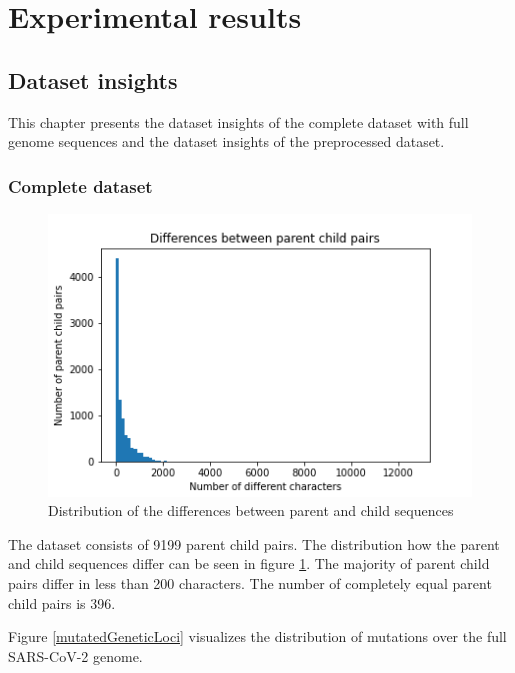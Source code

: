 \section{Experimental results} \label{experiments}

\subsection{Dataset insights}  \label{ch:experimentsA}

This chapter presents the dataset insights of the complete dataset with full genome sequences and the dataset insights of the preprocessed dataset.

\subsubsection{Complete dataset}  \label{ch:experimentsAa}

\begin{figure}
	\centering
	\includegraphics[width=0.9\linewidth]{figures/distributionDifferencesParentChild.png}
	\caption{Distribution of the differences between parent and child sequences \cite{own representation}}
	\label{distributionDifferencesParentChild}
\end{figure}

The dataset consists of 9199 parent child pairs.
The distribution how the parent and child sequences differ can be seen in figure \ref{distributionDifferencesParentChild}. The majority of parent child pairs differ in less than 200 characters. The number of completely equal parent child pairs is 396.

\vspace{2cm}
Figure \ref{mutatedGeneticLoci} visualizes the distribution of mutations over the full \ac{SARS-CoV-2} genome.

